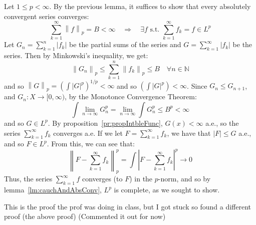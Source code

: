 \documentclass[oneside]{book}
\newcommand{\N}{\mathbb{N}}
\newcommand{\sse}{\subseteq}
\newcommand{\rw}{\rightarrow}
\newcommand{\Rw}{\Rightarrow}
\begin{document}
\begin{Proof}
	Let $1 \le p < \infty$. By the previous lemma, it suffices to show that every absolutely convergent series converges:
	\[
		\sum_{k=1}^\infty \left\| f\right\|_p = B < \infty \quad \Rw\quad \exists f \text{ s.t. } \sum_{k=1}^\infty f_k = f \in L^p
	\]
	Let $G_n = \sum_{k=1}^n |f_k|$ be the partial sums of the series and $G = \sum_{k=1}^\infty |f_k|$ be the series.
	Then by Minkowski's inequality, we get:
	\[
		\left\| G_n\right\|_p \le \sum_{k=1}^n \left\| f_k\right\|_p \le B \quad \forall n \in \N
	\]
	and so $\left\| G\right\|_p  = \left(\int |G|^p\right)^{1/p}< \infty$ and so $\left(\int |G|^p\right) < \infty$.
	Since $G_n \le G_{n+1}$, and $G_n: X \rw [0, \infty)$, by the Monotonce Convergence Theorem:
	\[
		\int \lim_{n \rw\infty} G_n^p = \lim_{n \rw \infty} \int G_n^p \le B^p < \infty
	\]
	and so $G \in L^p$. By proposition~\ref{pr:propIntbleFunc}, $G(x) < \infty$ a.e., so the series $\sum_{k=1}^\infty
	f_k$ converges a.e. If we let $F = \sum_{k=1}^\infty f_k$, we have that $|F| \le G$ a.e., and so $F \in L^p$. From
	this, we can see that:
	\[
		\left\|F - \sum_{k=1}^\infty f_k\right\|_p^p = \int \left| F - \sum_{k=1}^\infty f_k\right|^p \rw 0
	\]
	Thus, the series $\sum_{k=1}^\infty f$ converges (to $F$) in the $p$-norm, and so by lemma~\ref{lm:cauchAndAbsConv},
	$L^p$ is complete, as we sought to show. 



	This is the proof the prof was doing in class, but I got stuck so found a different proof (the above proof)
	(Commented it out for now)

\end{Proof}
\end{document}

